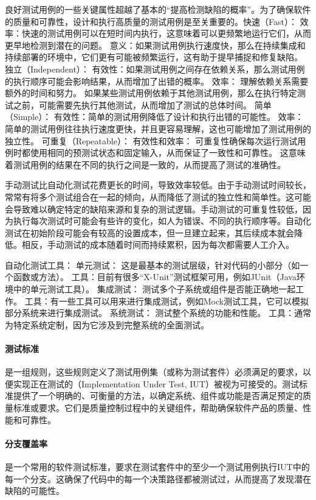 良好测试用例的一些关键属性超越了基本的“提高检测缺陷的概率”。为了确保软件的质量和可靠性，设计和执行高质量的测试用例是至关重要的。快速（Fast）：
效率：快速的测试用例可以在短时间内执行，这意味着可以更频繁地运行它们，从而更早地检测到潜在的问题。
意义：如果测试用例执行速度快，那么在持续集成和持续部署的环境中，它们更有可能被频繁运行，这有助于提早捕捉和修复缺陷。
独立（Independent）：
有效性：如果测试用例之间存在依赖关系，那么测试用例的执行顺序可能会影响结果，从而增加了出错的概率。
效率：
理解依赖关系需要额外的时间和努力。
如果某些测试用例依赖于其他测试用例，那么在执行特定测试之前，可能需要先执行其他测试，从而增加了测试的总体时间。
简单（Simple）：
有效性：简单的测试用例降低了设计和执行出错的可能性。
效率：简单的测试用例往往执行速度更快，并且更容易理解，这也可能增加了测试用例的独立性。
可重复（Repeatable）：
有效性和效率：
可重复性确保每次运行测试用例时都使用相同的预测试状态和固定输入，从而保证了一致性和可靠性。
这意味着测试用例的结果在不同的执行之间是一致的，从而提高了测试的准确性。

手动测试比自动化测试花费更长的时间，导致效率较低。由于手动测试时间较长，常常有将多个测试组合在一起的倾向，从而降低了测试的独立性和简单性。这可能会导致难以确定特定的缺陷来源和复杂的测试逻辑。手动测试的可重复性较低，因为执行每次测试时可能会有些许的变化，如人为错误、不同的执行顺序等。自动化测试在初始阶段可能会有较高的设置成本，但一旦建立起来，其后续成本就会降低。相反，手动测试的成本随着时间而持续累积，因为每次都需要人工介入。

自动化测试工具：
单元测试：
这是最基本的测试层级，针对代码的小部分（如一个函数或方法）。
工具：目前有很多“X-Unit”测试框架可用，例如JUnit（Java环境中的单元测试工具）。
集成测试：
测试多个子系统或组件是否能正确地一起工作。
工具：有一些工具可以用来进行集成测试，例如Mock测试工具，它可以模拟部分系统来进行集成测试。
系统测试：
测试整个系统的功能和性能。
工具：通常为特定系统定制，因为它涉及到完整系统的全面测试。

\paragraph{测试标准}是一组规则，这些规则定义了测试用例集（或称为测试套件）必须满足的要求，以便实现正在测试的（Implementation Under Test, IUT）被视为可接受的。测试标准提供了一个明确的、可衡量的方法，以确定系统、组件或功能是否满足预定的质量标准或要求。它们是质量控制过程中的关键组件，帮助确保软件产品的质量、性能和可靠性。

\paragraph{分支覆盖率}是一个常用的软件测试标准，要求在测试套件中的至少一个测试用例执行IUT中的每一个分支。这确保了代码中的每一个决策路径都被测试过，从而提高了发现潜在缺陷的可能性。

